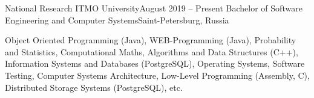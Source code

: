 
\begin{cvHeadingList}

  \cvCustomHeading
    {National Research ITMO University}{August 2019 – Present}
    {Bachelor of Software Engineering and Computer Systems}{Saint-Petersburg, Russia}

  \begin{cvList}
    \cvItem[Cources]
      Object Oriented Programming (Java),
      WEB-Programming (Java),
      Probability and Statistics,
      Computational Maths,
      Algorithms and Data Structures (C++),
      Information Systems and Databases (PostgreSQL),
      Operating Systems,
      Software Testing,
      Computer Systems Architecture,
      Low-Level Programming (Assembly, C),
      Distributed Storage Systems (PostgreSQL), etc.
  \end{cvList}

\end{cvHeadingList}
